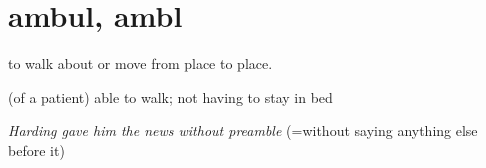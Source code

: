 \chapter{ambul, ambl}
\begin{vocabulary}[ambulance]
\end{vocabulary}

\begin{vocabulary} to walk about or move from place to place.
\end{vocabulary}

\begin{vocabulary} (of a patient) able to walk; not having to stay in bed
\end{vocabulary}

\begin{vocabulary}
\textit{Harding gave him the news without preamble} (=without saying anything else before it)
\end{vocabulary}